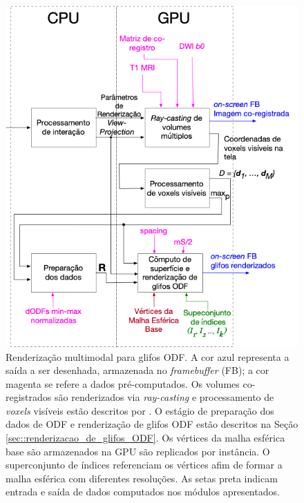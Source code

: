 \begin{figure}[ht]
    \centering
    \includegraphics[width=.7\linewidth, angle=0]{figs/Esquema_Glifo/fluxograma_glifos_VMTK_5.png}
    \caption{
    Renderização multimodal para glifos ODF. A cor azul representa a saída a ser desenhada, armazenada no \textit{framebuffer} (FB); a cor magenta se refere a dados pré-computados. Os volumes co-registrados são renderizados via \textit{ray-casting} e processamento de \textit{voxels} visíveis estão descritos por . O estágio de preparação dos dados de ODF e renderização de glifos ODF estão descritos na Seção \ref{sec::renderizacao_de_glifos_ODF}. Os vértices da malha esférica base são armazenados na GPU são replicados por instância. O superconjunto de índices referenciam os vértices afim de formar a malha esférica com diferentes resoluções. As setas preta indicam entrada e saída de dados computados nos módulos apresentados.
    }
    \label{fig::vmtk_simplified}
\end{figure}







